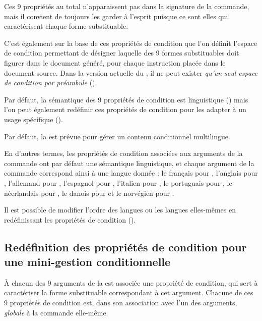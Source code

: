 \documentclass{article}
\begin{document}
Ces 9 propriétés au total n'apparaissent pas dans la signature de la commande, mais il convient de toujours les garder à l'esprit puisque ce sont elles qui caractérisent chaque forme substituable.

C'est également sur la base de ces propriétés de condition que l'on définit l'espace de condition permettant de désigner laquelle des 9 formes substituables doit figurer dans le document généré, pour chaque instruction  placée dans le document source. Dans la version actuelle du , il ne peut exister \emph{qu'un seul espace de condition  par préambule} ().

Par défaut, la sémantique des 9 propriétés de condition est linguistique () mais l'on peut également redéfinir ces propriétés de condition pour les adapter à un usage spécifique ().

\label{CtDoc_Commandes_MiniConditext_Multilingue}
Par défaut, la  est prévue pour gérer un contenu conditionnel multilingue.

En d'autres termes, les propriétés de condition associées aux arguments de la commande ont par défaut une sémantique linguistique, et chaque argument de la commande correspond ainsi à une langue donnée : le français pour , l'anglais pour , l'allemand pour , l'espagnol pour , l'italien pour , le portuguais pour , le néerlandais pour , le danois pour  et le norvégien pour .

Il est possible de modifier l'ordre des langues ou les langues elles-mêmes en redéfinissant les propriétés de condition ().

\subsection{Redéfinition des propriétés de condition pour une mini-gestion conditionnelle}\label{CtDoc_Commandes_SetMiniCondiProp-}
À chacun des 9 arguments de la  est associée une propriété de condition, qui sert à caractériser la forme substituable correspondant à cet argument. Chacune de ces 9 propriétés de condition est, dans son association avec l'un des arguments, \emph{globale} à la commande elle-même.
\end{document}

